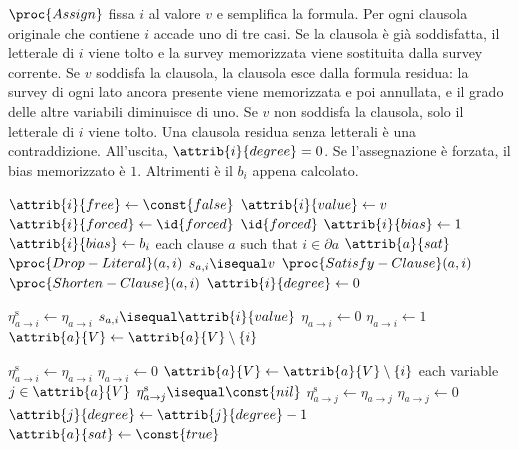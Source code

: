 $\proc{Assign}$ fissa $i$ al valore $v$ e semplifica la formula.
Per ogni clausola originale che contiene $i$ accade uno di tre casi.
Se la clausola è già soddisfatta, il letterale di $i$ viene tolto e la survey memorizzata viene sostituita dalla survey corrente.
Se $v$ soddisfa la clausola, la clausola esce dalla formula residua: la survey di ogni lato ancora presente viene memorizzata e poi annullata, e il grado delle altre variabili diminuisce di uno.
Se $v$ non soddisfa la clausola, solo il letterale di $i$ viene tolto.
Una clausola residua senza letterali è una contraddizione.
All'uscita, $\attrib{i}{degree}=0$.
Se l'assegnazione è forzata, il bias memorizzato è $1$.
Altrimenti è il $b_i$ appena calcolato.

\begin{codebox}
\li $\attrib{i}{free} \gets \const{false}$
\li $\attrib{i}{value} \gets v$
\li $\attrib{i}{forced} \gets \id{forced}$
\li \If $\id{forced}$
\li     \Then $\attrib{i}{bias} \gets 1$
\li     \Else $\attrib{i}{bias} \gets b_i$
        \End
\li \For each clause $a$ such that $i \in \partial a$
\li     \Do
            \If $\attrib{a}{sat}$
\li             \Then $\proc{Drop-Literal}(a, i)$
\li         \ElseIf $s_{a,i} \isequal v$
\li             \Then $\proc{Satisfy-Clause}(a, i)$
\li         \ElseNoIf
                $\proc{Shorten-Clause}(a, i)$
            \End
        \End
\li $\attrib{i}{degree} \gets 0$
\end{codebox}

\begin{codebox}
\li $\eta^{\mathrm{s}}_{a \to i} \gets \eta_{a \to i}$
\li \If $s_{a,i} \isequal \attrib{i}{value}$
\li     \Then $\eta_{a \to i} \gets 0$
\li     \Else $\eta_{a \to i} \gets 1$
        \End
\li $\attrib{a}{V} \gets \attrib{a}{V} \setminus \{i\}$
\end{codebox}

\begin{codebox}
\li $\eta^{\mathrm{s}}_{a \to i} \gets \eta_{a \to i}$
\li $\eta_{a \to i} \gets 0$
\li $\attrib{a}{V} \gets \attrib{a}{V} \setminus \{i\}$
\li \For each variable $j \in \attrib{a}{V}$
\li     \Do
            \If $\eta^{\mathrm{s}}_{a \to j} \isequal \const{nil}$
\li             \Then $\eta^{\mathrm{s}}_{a \to j} \gets \eta_{a \to j}$
                \End
\li         $\eta_{a \to j} \gets 0$
\li         $\attrib{j}{degree} \gets \attrib{j}{degree} - 1$
        \End
\li $\attrib{a}{sat} \gets \const{true}$
\end{codebox}

